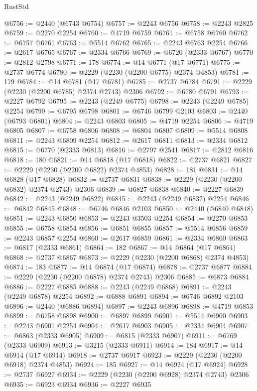 \begin{lexlean}{RustStd}
\begin{coremodule}
@6756 := @2440 (@6743 @6754)
@6757 := @2243 @6756
@6758 := @2243 @2825
@6759 := @2270 @2254
@6760 := @4719 @6759
@6761 := @6758 @6760
@6762 := @6757 @6761
@6763 := @5514 @6762
@6765 := @2243 @6763 @2254
@6766 := @2617 @6765
@6767 := @2334 @6766
@6769 := @6720 (@2333 @6767)
@6770 := @2812 @2798
@6771 := 178
@6774 := @14 @6771 (@17 @6771)
@6775 := @2737 @6774
@6780 := @2229 (@2230 (@2200 @6775) @2374 @4853)
@6781 := 179
@6784 := @14 @6781 (@17 @6781)
@6785 := @2737 @6784
@6791 := @2229 (@2230 (@2200 @6785) @2374 @2743) @2306
@6792 := @6780 @6791
@6793 := @2227 @6792
@6795 := @2243 (@2249 @6775)
@6798 := @2243 (@2249 @6785) @2254
@6799 := @6795 @6798
@6801 := @6746 @6799 @2103
@6803 := @2440 (@6793 @6801)
@6804 := @2243 @6803
@6805 := @4719 @2254
@6806 := @4719 @6805
@6807 := @6758 @6806
@6808 := @6804 @6807
@6809 := @5514 @6808
@6811 := @2243 @6809 @2254
@6812 := @2617 @6811
@6813 := @2334 @6812
@6815 := @6770 (@2333 @6813)
@6816 := @2797 @2541
@6817 := @2812 @6816
@6818 := 180
@6821 := @14 @6818 (@17 @6818)
@6822 := @2737 @6821
@6827 := @2229 (@2230 (@2200 @6822) @2374 @4853)
@6828 := 181
@6831 := @14 @6828 (@17 @6828)
@6832 := @2737 @6831
@6838 := @2229 (@2230 (@2200 @6832) @2374 @2743) @2306
@6839 := @6827 @6838
@6840 := @2227 @6839
@6842 := @2243 (@2249 @6822)
@6845 := @2243 (@2249 @6832) @2254
@6846 := @6842 @6845
@6848 := @6746 @6846 @2103
@6850 := @2440 (@6840 @6848)
@6851 := @2243 @6850
@6853 := @2243 @3503 @2254
@6854 := @2270 @6853
@6855 := @6758 @6854
@6856 := @6851 @6855
@6857 := @5514 @6856
@6859 := @2243 @6857 @2254
@6860 := @2617 @6859
@6861 := @2334 @6860
@6863 := @6817 (@2333 @6861)
@6864 := 182
@6867 := @14 @6864 (@17 @6864)
@6868 := @2737 @6867
@6873 := @2229 (@2230 (@2200 @6868) @2374 @4853)
@6874 := 183
@6877 := @14 @6874 (@17 @6874)
@6878 := @2737 @6877
@6884 := @2229 (@2230 (@2200 @6878) @2374 @2743) @2306
@6885 := @6873 @6884
@6886 := @2227 @6885
@6888 := @2243 (@2249 @6868)
@6891 := @2243 (@2249 @6878) @2254
@6892 := @6888 @6891
@6894 := @6746 @6892 @2103
@6896 := @2440 (@6886 @6894)
@6897 := @2243 @6896
@6898 := @4719 @6853
@6899 := @6758 @6898
@6900 := @6897 @6899
@6901 := @5514 @6900
@6903 := @2243 @6901 @2254
@6904 := @2617 @6903
@6905 := @2334 @6904
@6907 := @6863 (@2333 @6905)
@6909 := @6815 (@2333 @6907)
@6911 := @6769 (@2333 @6909)
@6913 := @3215 (@2333 @6911)
@6914 := 184
@6917 := @14 @6914 (@17 @6914)
@6918 := @2737 @6917
@6923 := @2229 (@2230 (@2200 @6918) @2374 @4853)
@6924 := 185
@6927 := @14 @6924 (@17 @6924)
@6928 := @2737 @6927
@6934 := @2229 (@2230 (@2200 @6928) @2374 @2743) @2306
@6935 := @6923 @6934
@6936 := @2227 @6935

\end{coremodule}
\end{lexlean}
